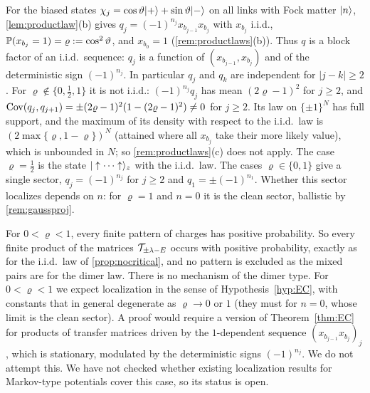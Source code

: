 \begin{remark}\label{rem:biased}
For the biased states $\chi_j=\cos\vartheta|+\rangle+\sin\vartheta|-\rangle$ on all links with Fock matter $|n\rangle$,
\cref{lem:productlaw}(b) gives $q_j=(-1)^{n_j}x_{b_{j-1}}x_{b_j}$ with $x_{b_j}$ i.i.d.,
$\mathbb{P}(x_{b_j}=1)=\varrho:=\cos^2\vartheta$, and $x_{b_0}=1$ (\cref{rem:productlaws}(b)).  Thus $q$ is a block
factor of an i.i.d.\ sequence: $q_j$ is a function of $(x_{b_{j-1}},x_{b_j})$ and of the deterministic sign
$(-1)^{n_j}$.  In particular $q_j$ and $q_k$ are independent for $|j-k|\ge2$.  For
$\varrho\notin\{0,\frac12,1\}$ it is not i.i.d.: $(-1)^{n_j}q_j$ has mean $(2\varrho-1)^2$ for $j\ge2$, and
$\operatorname{Cov}(q_j,q_{j+1})=\pm(2\varrho-1)^2(1-(2\varrho-1)^2)\neq0$ for $j\ge2$.  Its law on
$\{\pm1\}^N$ has full support, and the maximum of its density with respect to the i.i.d.\ law is
$(2\max\{\varrho,1-\varrho\})^N$ (attained where all $x_{b_j}$ take their more likely value), which is
unbounded in $N$; so \cref{rem:productlaws}(c) does not apply.  The case $\varrho=\frac12$ is the state
$|\uparrow\cdots\uparrow\rangle_z$ with the i.i.d.\ law.  The cases $\varrho\in\{0,1\}$ give a single sector,
$q_j=(-1)^{n_j}$ for $j\ge2$ and $q_1=\pm(-1)^{n_1}$.  Whether this sector localizes depends on $n$: for
$\varrho=1$ and $n=0$ it is the clean sector, ballistic by \cref{rem:gaussproj}.

For $0<\varrho<1$, every finite pattern of charges has positive probability.  So every finite product of the
matrices $\mathcal{T}_{\pm\lambda-E}$ occurs with positive probability, exactly as for the i.i.d.\ law of
\cref{prop:nocritical}, and no pattern is excluded as the mixed pairs are for the dimer law.  There is
no mechanism of the dimer type.  For $0<\varrho<1$ we expect localization in the sense of
Hypothesis~\ref{hyp:EC}, with constants that in general degenerate as $\varrho\to0$ or $1$ (they must
for $n=0$, whose limit is the clean sector).  A proof would require a version of Theorem~\ref{thm:EC}
for products of transfer matrices driven by the $1$-dependent sequence $(x_{b_{j-1}}x_{b_j})_j$, which is
stationary, modulated by the deterministic signs $(-1)^{n_j}$.  We do not attempt this.  We have not checked whether existing localization results for
Markov-type potentials cover this case, so its status is open.
\end{remark}

